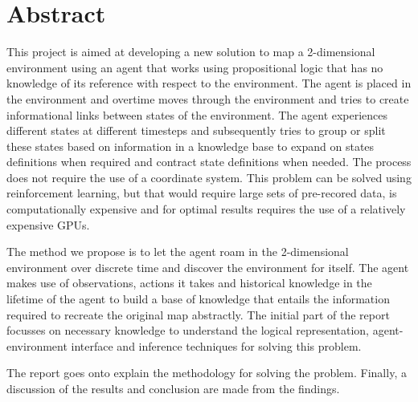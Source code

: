 \chapter{Abstract}

%
%

This project is aimed at developing a new solution to map a 2-dimensional environment using an agent that works using propositional logic that has no knowledge of its reference with respect to the environment. The agent is placed in the environment and overtime moves through the environment and tries to create informational links between states of the environment. The agent experiences different states at different timesteps and subsequently tries to group or split these states based on information in a knowledge base to expand on states definitions when required and contract state definitions when needed.
The process does not require the use of a coordinate system. This problem can be solved using reinforcement learning, but that would require large sets of pre-recored data, is computationally expensive and for optimal results requires the use of a relatively expensive GPUs.

The method we propose is to let the agent roam in the 2-dimensional environment over discrete time and discover the environment for itself.
The agent makes use of observations, actions it takes and historical knowledge in the lifetime of the agent to build a base of knowledge that entails the information required to recreate the original map abstractly. The initial part of the report focusses on necessary knowledge to understand the logical representation, agent-environment interface and inference techniques for solving this problem. 

The report goes onto explain the methodology for solving the problem.
Finally, a discussion of the results and conclusion are made from the findings.

